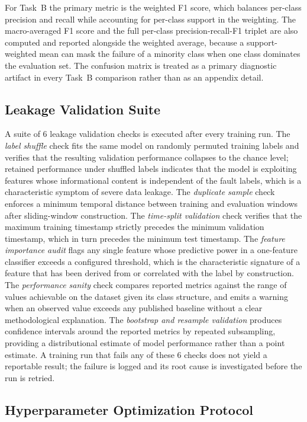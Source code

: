 For Task~B the primary metric is the weighted F1 score, which balances per-class precision and recall while accounting for per-class support in the weighting. The macro-averaged F1 score and the full per-class precision-recall-F1 triplet are also computed and reported alongside the weighted average, because a support-weighted mean can mask the failure of a minority class when one class dominates the evaluation set. The confusion matrix is treated as a primary diagnostic artifact in every Task~B comparison rather than as an appendix detail.

\subsection{Leakage Validation Suite}

A suite of 6 leakage validation checks is executed after every training run. The \emph{label shuffle} check fits the same model on randomly permuted training labels and verifies that the resulting validation performance collapses to the chance level; retained performance under shuffled labels indicates that the model is exploiting features whose informational content is independent of the fault labels, which is a characteristic symptom of severe data leakage. The \emph{duplicate sample} check enforces a minimum temporal distance between training and evaluation windows after sliding-window construction. The \emph{time-split validation} check verifies that the maximum training timestamp strictly precedes the minimum validation timestamp, which in turn precedes the minimum test timestamp. The \emph{feature importance audit} flags any single feature whose predictive power in a one-feature classifier exceeds a configured threshold, which is the characteristic signature of a feature that has been derived from or correlated with the label by construction. The \emph{performance sanity} check compares reported metrics against the range of values achievable on the dataset given its class structure, and emits a warning when an observed value exceeds any published baseline without a clear methodological explanation. The \emph{bootstrap and resample validation} produces confidence intervals around the reported metrics by repeated subsampling, providing a distributional estimate of model performance rather than a point estimate. A training run that fails any of these 6 checks does not yield a reportable result; the failure is logged and its root cause is investigated before the run is retried.

\subsection{Hyperparameter Optimization Protocol}

